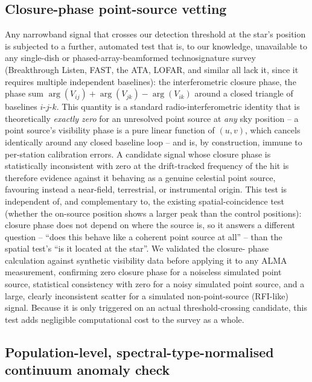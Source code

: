 \documentclass{openjournal}
\begin{document}
\subsection{Closure-phase point-source vetting}
\label{sec:closurephase}

Any narrowband signal that crosses our detection threshold at the star's
position is subjected to a further, automated test that is, to our
knowledge, unavailable to any single-dish or phased-array-beamformed
technosignature survey (Breakthrough Listen, FAST, the ATA, LOFAR, and
similar all lack it, since it requires multiple independent baselines):
the interferometric closure phase, the phase sum
$\arg(V_{ij}) + \arg(V_{jk}) - \arg(V_{ik})$ around a closed triangle of
baselines $i$-$j$-$k$. This quantity is a standard radio-interferometric
identity that is theoretically \emph{exactly zero} for an unresolved
point source at \emph{any} sky position -- a point source's visibility
phase is a pure linear function of $(u,v)$, which cancels identically
around any closed baseline loop -- and is, by construction, immune to
per-station calibration errors. A candidate signal whose closure phase is
statistically inconsistent with zero at the drift-tracked frequency of
the hit is therefore evidence against it behaving as a genuine celestial
point source, favouring instead a near-field, terrestrial, or
instrumental origin. This test is independent of, and complementary to,
the existing spatial-coincidence test (whether the on-source position
shows a larger peak than the control positions): closure phase does not
depend on where the source is, so it answers a different question --
``does this behave like a coherent point source at all'' -- than the
spatial test's ``is it located at the star''. We validated the closure-
phase calculation against synthetic visibility data before applying it to
any ALMA measurement, confirming zero closure phase for a noiseless
simulated point source, statistical consistency with zero for a noisy
simulated point source, and a large, clearly inconsistent scatter for a
simulated non-point-source (RFI-like) signal. Because it is only
triggered on an actual threshold-crossing candidate, this test adds
negligible computational cost to the survey as a whole.

\subsection{Population-level, spectral-type-normalised continuum anomaly check}
\label{sec:popanomaly}
\end{document}
